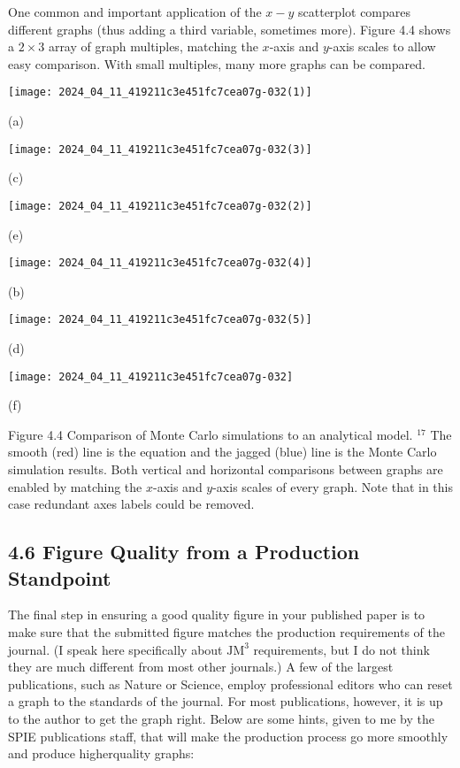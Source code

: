 One common and important application of the $x-y$ scatterplot compares different graphs (thus adding a third variable, sometimes more). Figure 4.4 shows a $2 \times 3$ array of graph multiples, matching the $x$-axis and $y$-axis scales to allow easy comparison. With small multiples, many more graphs can be compared.

\begin{center}
\texttt{[image: 2024\_04\_11\_419211c3e451fc7cea07g-032(1)]}
\end{center}

(a)

\begin{center}
\texttt{[image: 2024\_04\_11\_419211c3e451fc7cea07g-032(3)]}
\end{center}

(c)

\begin{center}
\texttt{[image: 2024\_04\_11\_419211c3e451fc7cea07g-032(2)]}
\end{center}

(e)

\begin{center}
\texttt{[image: 2024\_04\_11\_419211c3e451fc7cea07g-032(4)]}
\end{center}

(b)

\begin{center}
\texttt{[image: 2024\_04\_11\_419211c3e451fc7cea07g-032(5)]}
\end{center}

(d)

\begin{center}
\texttt{[image: 2024\_04\_11\_419211c3e451fc7cea07g-032]}
\end{center}

(f)

Figure 4.4 Comparison of Monte Carlo simulations to an analytical model. ${ }^{17}$ The smooth (red) line is the equation and the jagged (blue) line is the Monte Carlo simulation results. Both vertical and horizontal comparisons between graphs are enabled by matching the $x$-axis and $y$-axis scales of every graph. Note that in this case redundant axes labels could be removed.

\subsection*{4.6 Figure Quality from a Production Standpoint}
The final step in ensuring a good quality figure in your published paper is to make sure that the submitted figure matches the production requirements of the journal. (I speak here specifically about $\mathrm{JM}^{3}$ requirements, but I do not think they are much different from most other journals.) A few of the largest publications, such as Nature or Science, employ professional editors who can reset a graph to the standards of the journal. For most publications, however, it is up to the author to get the graph right. Below are some hints, given to me by the SPIE publications staff, that will make the production process go more smoothly and produce higherquality graphs:

